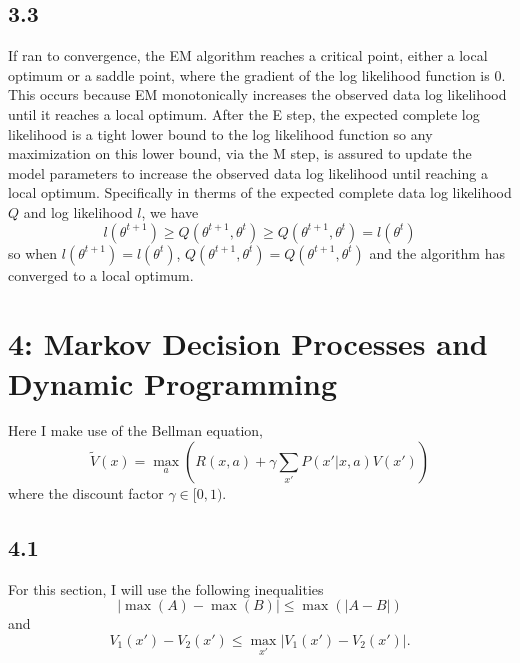 \documentclass[12pt]{amsart}
\begin{document}
\subsection*{3.3}
If ran to convergence, the EM algorithm reaches a critical point, either a local optimum or a saddle point, where the gradient of the log likelihood function is 0.  This occurs because EM monotonically increases the observed data log likelihood until it reaches a local optimum.  After the E step, the expected complete log likelihood is a tight lower bound to the log likelihood function so any maximization on this lower bound, via the M step, is assured to update the model parameters to increase the observed data log likelihood until reaching a local optimum.  Specifically in therms of the expected complete data log likelihood $Q$ and log likelihood $l$, we have
\begin{equation}
l(\theta^{t+1}) \geq Q(\theta^{t+1},\theta^{t}) \geq Q(\theta^{t+1},\theta^{t}) = l(\theta^{t}) 
\end{equation}
so when $l(\theta^{t+1}) = l(\theta^{t})$, $Q(\theta^{t+1},\theta^{t}) = Q(\theta^{t+1},\theta^{t})$ and the algorithm has converged to a local optimum.

\section*{4: Markov Decision Processes and Dynamic Programming}
Here I make use of the Bellman equation,
\begin{equation}
\tilde{V}(x) = \max_a \left( R(x,a) + \gamma \sum_{x'}P(x'|x,a)V(x') \right)
\end{equation}
where the discount factor $\gamma \in [0,1)$.

\subsection*{4.1}
For this section, I will use the following inequalities
\begin{equation} \label{eqn:max_ab}
|\max(A) - \max(B) | \leq \max(|A-B|)
\end{equation}
and
\begin{equation} \label{eqn:max_v}
V_1(x') - V_2(x') \leq \max_{x'} |V_1(x') - V_2(x')|.
\end{equation}
\end{document}
